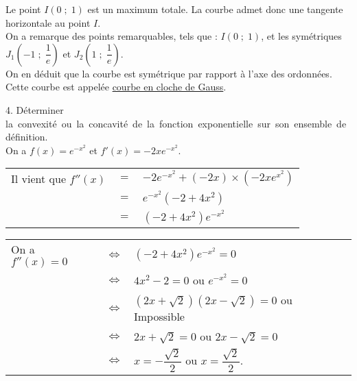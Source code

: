 Le point $I\left(0 \; ; \; 1\right)$ est un maximum totale. La courbe admet donc une tangente horizontale au point $I$. \\

On a remarque des points remarquables, tels que : $I\left(0 \; ; \; 1\right)$, et les symétriques $J_1\left(-1 \; ; \; \dfrac{1}{e}\right)$ et $J_2\left(1 \; ; \; \dfrac{1}{e}\right)$. \\

On en déduit que la courbe est symétrique par rapport à l'axe des ordonnées. \\

Cette courbe est appelée \underline{courbe en cloche de Gauss}.

\vspace*{-5cm}

\newpage

\vspace*{-2cm}

4. Déterminer \hbox{la convexité ou la concavité de la fonction exponentielle sur son ensemble de définition.} \\

On a $f(x) = e^{-x^2}$ et $f'(x) = -2xe^{-x^2}$. \\

\begin{tabular}{lll}
\hspace*{-.3cm} Il vient que $f''(x)$ & $=$ & $-2e^{-x^2} + \left(-2x\right)\times\left(-2xe^{x^2}\right)$ \\
& $=$ & $e^{-x^2}\left(-2 + 4x^2\right)$ \\
& $=$ & $\left(-2 + 4x^2\right)e^{-x^2}$ \\
\end{tabular}

\vspace*{.3cm}

\begin{tabular}{lll}
\hspace*{-.3cm} On a $f''(x) = 0$ & $\Longleftrightarrow$ & $\left(-2 + 4x^2\right)e^{-x^2} = 0$ \\
& $\Longleftrightarrow$ & $4x^2 - 2 = 0$ ou $e^{-x^2} = 0$ \\
& $\Longleftrightarrow$ & $\left(2x + \sqrt{2}\right)\left(2x-\sqrt{2}\right) = 0$ ou Impossible \\
& $\Longleftrightarrow$ & $2x + \sqrt{2} = 0$ ou $2x - \sqrt{2} = 0$ \\
& $\Longleftrightarrow$ & $x = -\dfrac{\sqrt{2}}{2}$ ou $x = \dfrac{\sqrt{2}}{2}$. \\
\end{tabular}

